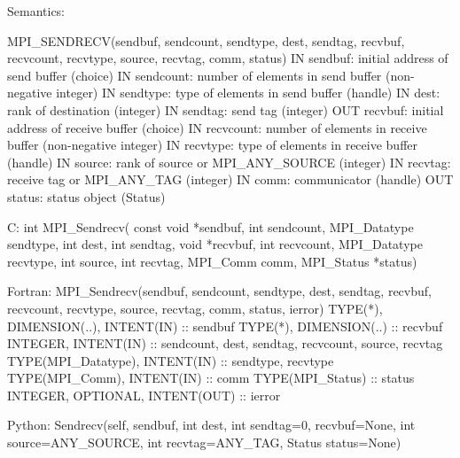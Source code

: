 Semantics:

MPI_SENDRECV(sendbuf, sendcount, sendtype, dest, sendtag, recvbuf,
recvcount, recvtype, source, recvtag, comm, status)
IN sendbuf: initial address of send buffer (choice)
IN sendcount: number of elements in send buffer (non-negative integer)
IN sendtype: type of elements in send buffer (handle)
IN dest: rank of destination (integer)
IN sendtag: send tag (integer)
OUT recvbuf: initial address of receive buffer (choice)
IN recvcount: number of elements in receive buffer (non-negative integer)
IN recvtype: type of elements in receive buffer (handle)
IN source: rank of source or MPI_ANY_SOURCE (integer)
IN recvtag: receive tag or MPI_ANY_TAG (integer)
IN comm: communicator (handle)
OUT status: status object (Status)

C:
int MPI_Sendrecv(
    const void *sendbuf, int sendcount, MPI_Datatype sendtype,
    int dest, int sendtag,
    void *recvbuf, int recvcount, MPI_Datatype recvtype,
    int source, int recvtag,
    MPI_Comm comm, MPI_Status *status)

Fortran:
MPI_Sendrecv(sendbuf, sendcount, sendtype, dest, sendtag, recvbuf,
recvcount, recvtype, source, recvtag, comm, status, ierror)
TYPE(*), DIMENSION(..), INTENT(IN) :: sendbuf
TYPE(*), DIMENSION(..) :: recvbuf
INTEGER, INTENT(IN) :: sendcount, dest, sendtag, recvcount, source,
recvtag
TYPE(MPI_Datatype), INTENT(IN) :: sendtype, recvtype
TYPE(MPI_Comm), INTENT(IN) :: comm
TYPE(MPI_Status) :: status
INTEGER, OPTIONAL, INTENT(OUT) :: ierror

Python:
Sendrecv(self, sendbuf, int dest, int sendtag=0,
    recvbuf=None, int source=ANY_SOURCE, int recvtag=ANY_TAG,
    Status status=None)

